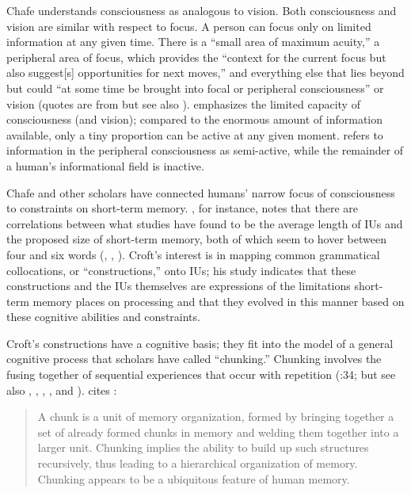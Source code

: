 Chafe understands consciousness as analogous to vision. Both consciousness and vision are similar with respect to focus. A person can focus only on limited information at any given time. There is a “small area of maximum acuity,” a peripheral area of focus, which provides the “context for the current focus but also suggest[s] opportunities for next moves,” and everything else that lies beyond but could “at some time be brought into focal or peripheral consciousness” or vision (quotes are from \citealt[53]{Chafe1994} but see also \citealt[12--13]{Chafe1980}). \citet[11]{Chafe1980} emphasizes the limited capacity of consciousness (and vision); compared to the enormous amount of information available, only a tiny proportion can be active at any given moment. \citet[53]{Chafe1994} refers to information in the peripheral consciousness as semi-active, while the remainder of a human’s informational field is inactive.

Chafe and other scholars have connected humans’ narrow focus of consciousness to constraints on short-term memory. \citet[873]{Croft1995}, for instance, notes that there are correlations between what studies have found to be the average length of IUs and the proposed size of short-term memory, both of which seem to hover between four and six words (\citealt[282]{Altenberg1990}, \citealt[256]{Crystal1969}, \citealt[14]{Chafe1980}). Croft’s interest is in mapping common grammatical collocations, or “constructions,” onto IUs; his study indicates that these constructions and the IUs themselves are expressions of the limitations short-term memory places on processing and that they evolved in this manner based on these cognitive abilities and constraints.\largerpage[-1]

Croft’s constructions have a cognitive basis; they fit into the model of a general cognitive process that scholars have called “chunking.” Chunking involves the fusing together of sequential experiences that occur with repetition (\citealt{Bybee2010}:34; but see also \citealt{Miller1956}, \citealt{Newell1990}, \citealt{Haiman1994}, \citealt{Ellis1996}, and \citealt{Bybee2002a}). \citet[34]{Bybee2010} cites \citet[7]{Newell1990}:

\begin{quote}
A chunk is a unit of memory organization, formed by bringing together a set of already formed chunks in memory and welding them together into a larger unit. Chunking implies the ability to build up such structures recursively, thus leading to a hierarchical organization of memory. Chunking appears to be a ubiquitous feature of human memory.
\end{quote}


